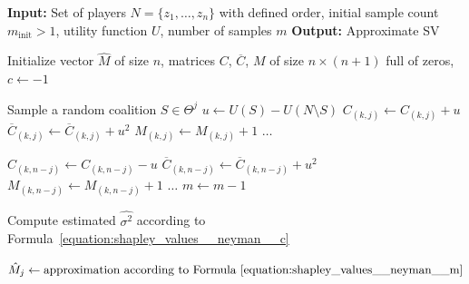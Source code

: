\begin{algorithm}[H]
\caption{Neyman-based algorithm for approximation of Shapley values (SV) using Complementary Contributions (CC).}
\label{alg:shapley_values__neyman__alg}
\begin{algorithmic}[1]

\State \textbf{Input:} Set of players $N = \{z_1, \dots, z_n\}$ with defined order, initial sample count $m_{\text{init}} > 1$, utility function $U$, number of samples $m$
\State \textbf{Output:} Approximate SV

\State Initialize vector $\hat{M}$ of size $n$, matrices $C$, $\overline{C}$, $M$ of size $n \times (n + 1)$ full of zeros, $c \gets -1$

             
                \State Sample a random coalition $S \in \Theta^j$
                \State $u \gets U(S) - U(N \setminus S)$
                     
                        \State $C_{(k,j)} \gets C_{(k,j)} + u$
                        \State $\overline{C}_{(k,j)} \gets \overline{C}_{(k,j)} + u^2$
                        \State $M_{(k,j)} \gets M_{(k,j)} + 1$
                    \EndFor
                \Else
                    \State $\dots$ 
                \EndIf

                        \State $C_{(k, n - j)} \gets C_{(k, n - j)} - u$
                        \State $\overline{C}_{(k,n-j)} \gets \overline{C}_{(k,n-j)} + u^2$
                        \State $M_{(k, n - j)} \gets M_{(k, n - j)} + 1$
                    \EndFor
                \Else
                    \State $\dots$ 
                \EndIf
                \State $m \gets m -1$
            \EndIf
        \EndFor
    \EndFor
\EndWhile

\State Compute estimated $\hat{\sigma^2}$ according to Formula~\ref{equation:shapley_values__neyman__c} 

    \State $\hat{M}_j \gets \text{approximation according to Formula~\ref{equation:shapley_values__neyman__m}}$
\EndFor


\end{algorithmic}
\end{algorithm}

